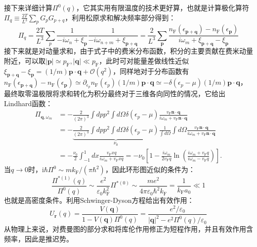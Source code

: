 \documentclass[10pt,openany]{book}
\theoremstyle{thmstyle} %
\theoremstyle{defstyle} %
\theoremstyle{prostyle} %
\begin{document}
接下来详细计算$ \Pi^0(q) $，它其实用有限温度的技术更好算，也就是计算极化算符$ \Pi_q \equiv \frac{2 T}{L^3} \sum_p G_p G_{p+q} $，利用松原求和解决频率部分得到：
\begin{equation}
  \Pi_q=\frac{2 T}{L^3} \sum_p \frac{1}{-i \omega_n+\xi_{\mathbf{p}}} \frac{1}{-i \omega_{n+m}+\xi_{\mathbf{p}+\mathbf{q}}}=\frac{2}{L^3} \sum_{\mathbf{p}} \frac{n_{\mathrm{F}}\left(\epsilon_{\mathbf{p}+\mathbf{q}}\right)-n_{\mathrm{F}}\left(\epsilon_{\mathbf{p}}\right)}{i \omega_m+\xi_{\mathbf{p}+\mathbf{q}}-\xi_{\mathbf{p}}}
\end{equation}
接下来就是对动量求和，由于式子中的费米分布函数，积分的主要贡献在费米动量附近，可以取$ |\mathbf{p}| \simeq p_{\mathrm{F}},|\mathbf{q}| \ll p_{\mathrm{F}} $，此时可对能量差做线性近似$ \xi_{\mathbf{p}+\mathbf{q}}-\xi_{\mathbf{p}}=(1 / m) \mathbf{p} \cdot \mathbf{q}+\mathcal{O}\left(q^2\right) $，同样地对于分布函数有$ n_{\mathrm{F}}\left(\epsilon_{\mathbf{p}+\mathbf{q}}\right)-n_{\mathrm{F}}\left(\epsilon_{\mathbf{p}}\right) \simeq \partial_{\epsilon_p} n_{\mathrm{F}}\left(\epsilon_p\right)(1 / m) \mathbf{p} \cdot \mathbf{q} \simeq-\delta\left(\epsilon_p-\mu\right)(1 / m) \mathbf{p} \cdot \mathbf{q} $，最终取零温极限将求和转化为积分最终对于三维各向同性的情况，它给出Lindhard函数：
\begin{equation}
  \begin{aligned}
    \Pi_{\mathbf{q}, \omega_m} & =-\frac{2}{(2 \pi)^3} \int d p p^2 \int d \Omega \delta\left(\epsilon_p-\mu\right) \frac{v_{\mathrm{F}} \mathbf{n} \cdot \mathbf{q}}{i \omega_m+v_{\mathrm{F}} \mathbf{n} \cdot \mathbf{q}} \\
    & =-\underbrace{\frac{2}{(2 \pi)^3} \int d p p^2 \int d \Omega \delta\left(\epsilon_p-\mu\right)}_{\nu_0} \frac{1}{\int d \Omega} \int d \Omega \frac{v_{\mathrm{F}} \mathbf{n} \cdot \mathbf{q}}{i \omega_m+v_{\mathrm{F}} \mathbf{n} \cdot \mathbf{q}} \\
    & =-\frac{\nu_0}{2} \int_{-1}^1 d x \frac{v_{\mathrm{F}} x q}{i \omega_m+v_{\mathrm{F}} x q}=-\nu_0\left[1-\frac{i \omega_m}{2 v_{\mathrm{F}} q} \ln \left(\frac{i \omega_m+v_{\mathrm{F}} q}{i \omega_m-v_{\mathrm{F}} q}\right)\right] .
    \end{aligned}
\end{equation}  
当$ q\to0 $时，$ \mathrm{i} \hbar \Pi^0 \sim m k_{\mathrm{F}} /\left(\pi \hbar^2\right) $，因此环形图近似的条件为：
\begin{equation}
  \frac{\Pi^{*(1)}(q)}{\Pi^0(q)} \sim \frac{e^2}{\varepsilon_0 k_{\mathrm{F}}^2} \Pi^{*(0)} \sim \frac{m e^2}{4 \pi \varepsilon_0 \hbar^2 k_{\mathrm{F}}}=\frac{1}{k_{\mathrm{F}} a_0} \ll 1
\end{equation}
也就是高密度条件。利用Schwinger-Dyson方程给出有效作用：
\begin{equation}
  U_{\mathbf{r}}(q)=\frac{V(\boldsymbol{q})}{1-V(\boldsymbol{q}) \Pi^0(q)}=\frac{e^2 / \varepsilon_0}{|\boldsymbol{q}|^2-e^2 \Pi^0(q) / \varepsilon_0}
\end{equation}  
从物理上来说，对费曼图的部分求和将库伦作用修正为短程作用，并且有效作用含频率，因此是推迟势。\\
\end{document}

